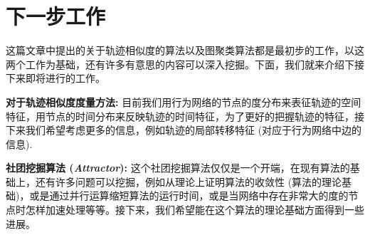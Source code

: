 \section{下一步工作}
这篇文章中提出的关于轨迹相似度的算法以及图聚类算法都是最初步的工作，以这两个工作为基础，还有许多有意思的内容可以深入挖掘。下面，我们就来介绍下接下来即将进行的工作。\par
\vspace{2mm}
\textbf{对于轨迹相似度度量方法:} 目前我们用行为网络的节点的度分布来表征轨迹的空间特征，用节点的时间分布来反映轨迹的时间特征，为了更好的把握轨迹的特征，接下来我们希望考虑更多的信息，例如轨迹的局部转移特征 (对应于行为网络中边的信息). \par
\vspace{2mm}
\textbf{社团挖掘算法 (\emph{Attractor}):} 这个社团挖掘算法仅仅是一个开端，在现有算法的基础上，还有许多问题可以挖掘，例如从理论上证明算法的收敛性 (算法的理论基础)，或是通过并行运算缩短算法的运行时间，或是当网络中存在非常大的度的节点时怎样加速处理等等。接下来，我们希望能在这个算法的理论基础方面得到一些进展。

